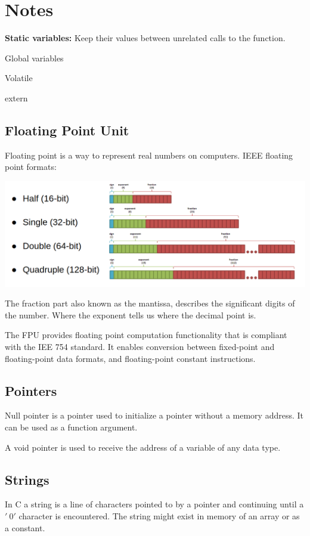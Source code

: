 \section{Notes}


\textbf{Static variables:} Keep their values between unrelated calls to the function.

Global variables

Volatile

extern

\subsection{Floating Point Unit}
Floating point is a way to represent real numbers on computers.
IEEE floating point formats:

\begin{center}
	\includegraphics[width=\textwidth]{images/FPU.png}
\end{center}

The fraction part also known as the mantissa, describes
the significant digits of the number.
Where the exponent tells us where the decimal point is.



The FPU provides floating point computation functionality
that is compliant with the IEE 754 standard.
It enables conversion between fixed-point and floating-point data
formats, and floating-point constant instructions.

\subsection{Pointers}
Null pointer is a pointer used to initialize a pointer without
a memory address. It can be used as a function argument.

A void pointer is used to receive the address of a variable
of any data type.

\subsection{Strings}
In C a string is a line of characters pointed to by a pointer and
continuing until a $'\ 0'$ character is encountered.
The string might exist in memory of an array or as a constant.


